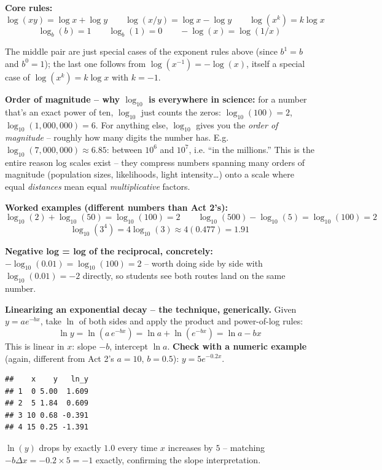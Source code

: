 \documentclass[12pt,]{article}
\begin{document}
\textbf{Core rules:}
\[\log(xy)=\log x + \log y \qquad \log(x/y) = \log x - \log y \qquad \log(x^k)=k\log x\]
\[\log_b(b)=1 \qquad \log_b(1)=0 \qquad -\log(x) = \log(1/x)\]

The middle pair are just special cases of the exponent rules above
(since \(b^1=b\) and \(b^0=1\)); the last one follows from
\(\log(x^{-1})=-\log(x)\), itself a special case of
\(\log(x^k)=k\log x\) with \(k=-1\).

\textbf{Order of magnitude -- why \(\log_{10}\) is everywhere in
science:} for a number that's an exact power of ten, \(\log_{10}\) just
counts the zeros: \(\log_{10}(100)=2\), \(\log_{10}(1{,}000{,}000)=6\).
For anything else, \(\log_{10}\) gives you the \emph{order of magnitude}
-- roughly how many digits the number has. E.g.
\(\log_{10}(7{,}000{,}000)\approx6.85\): between \(10^6\) and \(10^7\),
i.e. ``in the millions.'' This is the entire reason log scales exist --
they compress numbers spanning many orders of magnitude (population
sizes, likelihoods, light intensity\ldots{}) onto a scale where equal
\emph{distances} mean equal \emph{multiplicative} factors.

\textbf{Worked examples (different numbers than Act 2's):}
\[\log_{10}(2) + \log_{10}(50) = \log_{10}(100) = 2 \qquad \log_{10}(500)-\log_{10}(5)=\log_{10}(100)=2\]
\[\log_{10}(3^4) = 4\log_{10}(3) \approx 4(0.477) = 1.91\]

\textbf{Negative log = log of the reciprocal, concretely:}
\(-\log_{10}(0.01) = \log_{10}(100) = 2\) -- worth doing side by side
with \(\log_{10}(0.01)=-2\) directly, so students see both routes land
on the same number.

\textbf{Linearizing an exponential decay -- the technique, generically.}
Given \(y=ae^{-bx}\), take \(\ln\) of both sides and apply the product
and power-of-log rules:
\[\ln y = \ln(a\,e^{-bx}) = \ln a + \ln(e^{-bx}) = \ln a - bx\] This is
linear in \(x\): slope \(-b\), intercept \(\ln a\). \textbf{Check with a
numeric example} (again, different from Act 2's \(a=10,\,b=0.5\)):
\(y=5e^{-0.2x}\).

\begin{verbatim}
##    x    y   ln_y
## 1  0 5.00  1.609
## 2  5 1.84  0.609
## 3 10 0.68 -0.391
## 4 15 0.25 -1.391
\end{verbatim}

\(\ln(y)\) drops by exactly \(1.0\) every time \(x\) increases by \(5\)
-- matching \(-b\Delta x = -0.2\times5=-1\) exactly, confirming the
slope interpretation.
\end{document}
